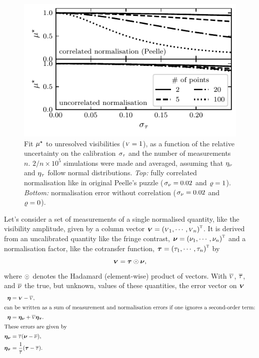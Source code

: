 \documentclass{pasa}
\begin{document}
\begin{figure}
\centering
\includegraphics[width=\linewidth]{pdf/uncorrelated-peelle.pdf}
\caption{Fit $\mu^\star$  to unresolved visibilities (${\scriptstyle V} = 1$), as a function of the relative uncertainty on the calibration $\sigma_\tau$ and the number of measurements $n$. $2/n\times10^5$ simulations were made and averaged, assuming that $\eta_\nu$ and $\eta_\tau$ follow normal distributions. \textit{Top:} fully correlated normalisation like in original Peelle's puzzle ($\sigma_\nu=0.02$ and $\varrho = 1$). \textit{Bottom:} normalisation error without correlation ($\sigma_\nu=0.02$ and $\varrho = 0$).}
\label{fig:uncorr-peelle}
\end{figure}

Let's consider a set of measurements of a single normalised quantity, like the visibility amplitude, given by a column vector $\boldsymbol{{\scriptstyle V}} = {({\scriptstyle V}_1, \cdots, {\scriptstyle V}_n)}^\text{\textsc{t}}$. It is derived from an uncalibrated quantity like the fringe contrast, $\boldsymbol{\nu} = {(\nu_1, \cdots, \nu_n)}^\text{\textsc{t}}$ and a normalisation factor, like the cotransfer function, $\boldsymbol{\tau} = {(\tau_1, \cdots, \tau_n)}^\text{\textsc{t}}$ by 
\begin{equation}
    \boldsymbol{{\scriptstyle V}} = \boldsymbol{\tau}\odot\boldsymbol{\nu},
\end{equation}
where $\odot$ denotes the Hadamard (element-wise) product of vectors. With $\overline{{\scriptstyle V}}$, $\overline{\tau}$, and $\overline{\nu}$ the true, but unknown, values of these quantities, the error vector on $\boldsymbol{{\scriptstyle V}}$  
\begin{align}
    \boldsymbol{\eta}    &= \boldsymbol{{\scriptstyle V}} - \overline{{\scriptstyle V}}, \\
\intertext{can be written as a sum of measurement and normalisation errors if one ignores a second-order term:}
    \boldsymbol{\eta}    &= \boldsymbol{\eta_\nu} + \overline{{\scriptstyle V}} \boldsymbol{\eta_\tau}.\\
\intertext{These errors are given by}
    \boldsymbol{\eta_\nu} &= \overline{\tau} (\boldsymbol{\nu} - \overline{\nu}), \\
    \boldsymbol{\eta_\tau} &= \frac1{\overline{\tau}} (\boldsymbol{\tau}-\overline{\tau}).
\end{align}
\end{document}
